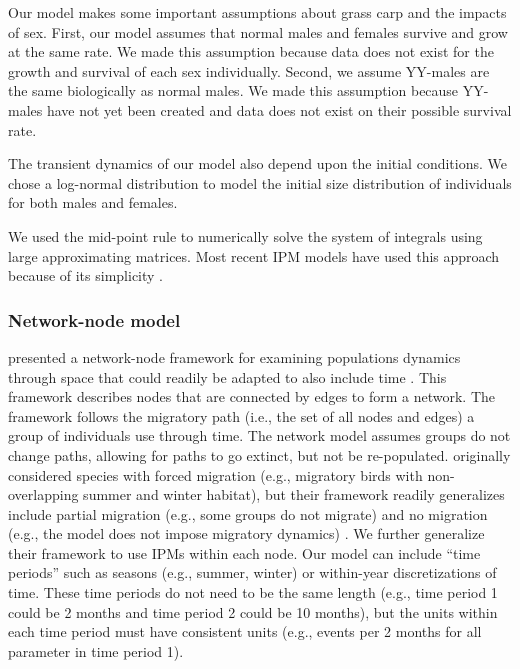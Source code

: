 \documentclass{article}[12pt]
\begin{document}
Our model makes some important assumptions about grass carp and the impacts of sex.
First, our model assumes that normal males and females survive and grow at the same rate.
We made this assumption because data does not exist for the growth and survival of each sex individually.
Second, we assume YY-males are the same biologically as normal males.
We made this assumption because YY-males have not yet been created and data does not exist on their possible survival rate.

The transient dynamics of our model also depend upon the initial conditions.
We chose a log-normal distribution to model the initial size distribution of individuals for both males and females.
 

We used the mid-point rule to numerically solve the system of integrals \citep{burden2005numerical} using large approximating matrices.
Most recent IPM models have used this approach because of its simplicity \citep{ellner2006integral, ramula2009integral, merow2014advancing}.

\subsubsection{Network-node model}


 \citet{Taylor:2010} presented a network-node framework for examining populations dynamics through space that could readily be adapted to also include time \citep[e.g.,][]{Erickson:2014, Wiederholt:inreview, erickson2016effects}.
This framework describes nodes that are connected by edges to form a network. 
The framework follows the migratory path (i.e., the set of all nodes and edges) a group of individuals use through time.
The network model assumes groups do not change paths, allowing for paths to go extinct, but not be re-populated.
 \citet{Taylor:2010} originally considered species with forced migration (e.g., migratory birds with non-overlapping summer and winter habitat), but their framework readily generalizes include partial migration (e.g., some groups do not migrate) and no migration (e.g., the model does not impose migratory dynamics) \citep{erickson:2017}. 
 We further generalize their framework to use IPMs within each node. 
 Our model can include ``time periods'' such as seasons (e.g., summer, winter) or within-year discretizations of time. 
 These time periods do not need to be the same length (e.g., time period 1 could be 2 months and time period 2 could be 10 months), but the units within each time period must have consistent units (e.g., events per 2 months for all parameter in time period 1).
 
\end{document}
